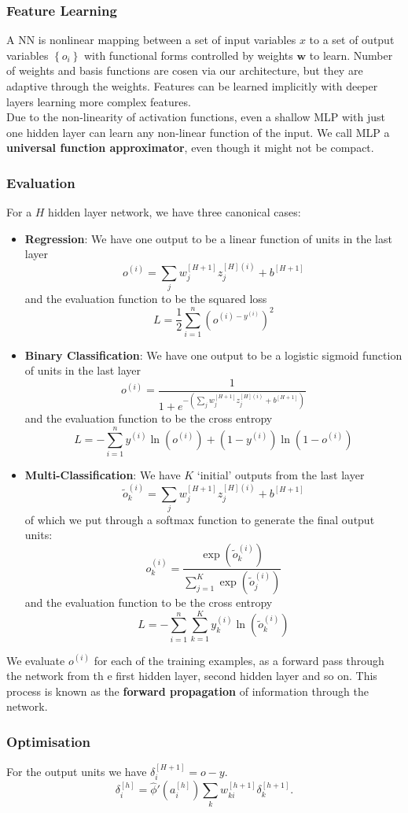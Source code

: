 \subsubsection{Feature Learning}
A NN is nonlinear mapping between a set of input variables $x$ to a set of
output variables $\left\{ o_i \right\}$ with functional forms controlled by
weights $\mathbf{w}$ to learn. Number of weights and basis functions are cosen
via our architecture, but they are adaptive through the weights. Features can
be learned implicitly with deeper layers learning more complex features.\\
Due to the non-linearity of activation functions, even a shallow MLP with just
one hidden layer can learn any non-linear function of the input. We call
MLP a \textbf{universal function approximator}, even though it might not be
compact.
\subsubsection{Evaluation}
For a $H$ hidden layer network, we have three canonical cases:
\begin{itemize}
  \item \textbf{Regression}: We have one output to be a linear function of
    units in the last layer 
    \[o^{(i)}=\sum_{j} w_j^{[H+1]}z_j^{[H](i)}+b^{[H+1]}\]
    and the evaluation function to be the squared loss
    \[L=\frac{1}{2}\sum_{i=1}^{n} {(o^{(i)-y^{(i)}})}^{2}\]
  \item \textbf{Binary Classification}: We have one output to be a logistic sigmoid
    function of units in the last layer
    \[o^{(i)}=\frac{1}{1+e^{-(\sum_{j} w_j^{[H+1]}z_j^{[H](i)}+b^{[H+1]})}}\]
    and the evaluation function to be the cross entropy
    \[L=-\sum_{i=1}^{n} y^{(i)}\ln(o^{(i)})+(1-y^{(i)})\ln(1-o^{(i)})\] 
  \item \textbf{Multi-Classification}: We have $K$ `initial' outputs from the
    last layer
    \[\tilde{o}_k^{(i)}=\sum_{j} w_j^{[H+1]}z_j^{[H](i)}+b^{[H+1]}\]
    of which we put through a softmax function to generate the final
    output units:
    \[o^{(i)}_k=\frac{\exp(\tilde{o}_k^{(i)})}{\sum_{j=1}^{K} \exp(\tilde{o}_j^{(i)})}\] 
    and the evaluation function to be the cross entropy
    \[L=-\sum_{i=1}^{n} \sum_{k=1}^{K} y_k^{(i)}\ln(\tilde{o}_k^{(i)})\] 
\end{itemize}
We evaluate $o^{(i)}$ for each of the training examples, as a forward pass
through the network from th e first hidden layer, second hidden layer and so
on. This process is known as the \textbf{forward propagation} of information
through the network.
\subsubsection{Optimisation}
For the output units we have $\delta_i^{[H+1]}=o-y$.
\[\delta_i^{[h]}=\hat{\phi}'\left( a_i^{[h]} \right) \sum_{k} w_{ki}^{[h+1]}\delta_k^{[h+1]}.\]
